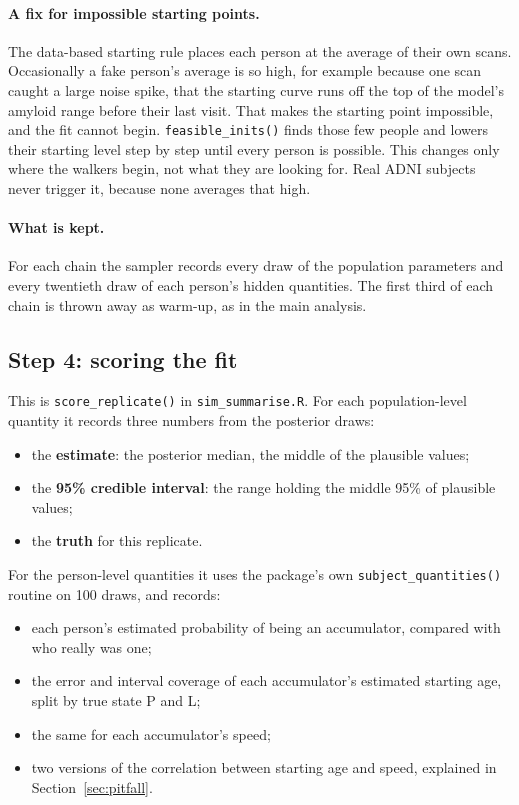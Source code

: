 \documentclass[11pt]{article}
\newcommand{\code}[1]{\texttt{\small #1}}
\begin{document}
\paragraph{A fix for impossible starting points.} The data-based starting rule places each person at the average of their own scans. Occasionally a fake person's average is so high, for example because one scan caught a large noise spike, that the starting curve runs off the top of the model's amyloid range before their last visit. That makes the starting point impossible, and the fit cannot begin. \code{feasible\_inits()} finds those few people and lowers their starting level step by step until every person is possible. This changes only where the walkers begin, not what they are looking for. Real ADNI subjects never trigger it, because none averages that high.

\paragraph{What is kept.} For each chain the sampler records every draw of the population parameters and every twentieth draw of each person's hidden quantities. The first third of each chain is thrown away as warm-up, as in the main analysis.

\subsection{Step 4: scoring the fit}

This is \code{score\_replicate()} in \code{sim\_summarise.R}. For each population-level quantity it records three numbers from the posterior draws:

\begin{itemize}
  \item the \textbf{estimate}: the posterior median, the middle of the plausible values;
  \item the \textbf{95\% credible interval}: the range holding the middle 95\% of plausible values;
  \item the \textbf{truth} for this replicate.
\end{itemize}

For the person-level quantities it uses the package's own \code{subject\_quantities()} routine on 100 draws, and records:

\begin{itemize}
  \item each person's estimated probability of being an accumulator, compared with who really was one;
  \item the error and interval coverage of each accumulator's estimated starting age, split by true state P and L;
  \item the same for each accumulator's speed;
  \item two versions of the correlation between starting age and speed, explained in Section~\ref{sec:pitfall}.
\end{itemize}
\end{document}
